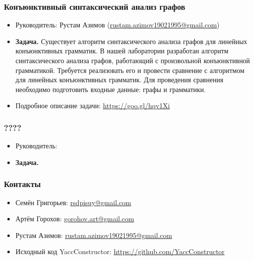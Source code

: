 \documentclass{beamer}
\begin{document}
\begin{frame}
  \transwipe[direction=90]
  \frametitle{Конъюнктивный синтаксический анализ графов}
  \begin{itemize}
    \item Руководитель: Рустам Азимов (\url{rustam.azimov19021995@gmail.com})
    \item \textbf{Задача.} 
    Существует алгоритм синтаксического анализа графов для линейных конъюнктивных грамматик. 
    В нашей лаборатории разработан алгоритм синтаксического анализа графов, работающий с произвольной конъюнктивной грамматикой.
    Требуется реализовать его и провести сравнение с алгоритмом для линейных конъюнктивных грамматик. 
    Для проведения сравнения необходимо подготовить входные данные: графы и грамматики.
    \item Подробное описание задачи: \url{https://goo.gl/hqv1Xi}
  \end{itemize}
\end{frame}

\begin{frame}
  \transwipe[direction=90]
  \frametitle{????}
  \begin{itemize}
    \item Руководитель:
    \item \textbf{Задача.}
  \end{itemize}
\end{frame}

            
\begin{frame}
\transwipe[direction=90]
\frametitle{Контакты}
\begin{itemize}
  \item Семён Григорьев: \url{rsdpisuy@gmail.com}
  \item Артём Горохов: \url{gorohov.art@gmail.com}
  \item Рустам Азимов: \url{rustam.azimov19021995@gmail.com}
  \item Исходный код YaccConstructor: \url{https://github.com/YaccConstructor}
\end{itemize}
\end{frame}
\end{document}
